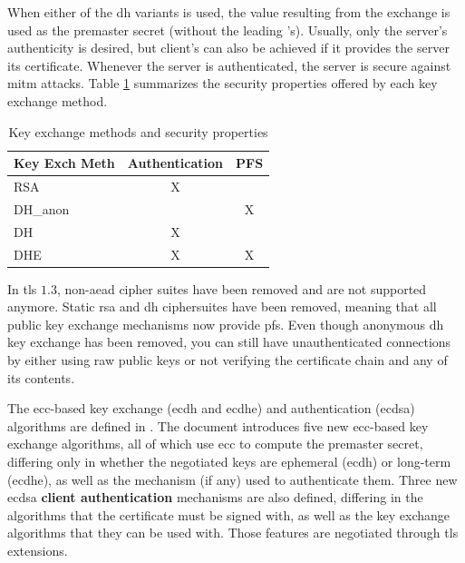 \documentclass{llncs}
\begin{document}
When either of the \gls{dh} variants is used, the value resulting from the exchange is used
as the premaster secret (without the leading 's). Usually, only the server's
authenticity is desired, but client's can also be achieved if it provides the
server its certificate. Whenever the server is authenticated, the server is secure
against \gls{mitm} attacks. Table \ref{kemsp} summarizes the security properties
offered by each key exchange method.

\begin{table}[]
\centering
\caption{Key exchange methods and security properties}
\label{kemsp}
\begin{tabular}{|l|c|l|}
\hline
\textbf{Key Exch Meth} & \multicolumn{1}{l|}{Authentication} & PFS                    \\ \hline
RSA                          & X                                   &                        \\ \hline
DH\_anon                     & \multicolumn{1}{l|}{}               & \multicolumn{1}{c|}{X} \\ \hline
DH                           & X                                   &                        \\ \hline
DHE                          & X                                   & \multicolumn{1}{c|}{X} \\ \hline
\end{tabular}
\end{table}

In \gls{tls} $1.3$, non-\gls{aead} cipher suites have been removed and are not supported anymore.
Static \gls{rsa} and \gls{dh} ciphersuites have been removed, meaning that all
public key exchange mechanisms now provide \gls{pfs}. Even though
anonymous \gls{dh} key exchange has been removed, you can still have
unauthenticated connections by either using raw public keys\cite{RFC7250} or not verifying the certificate chain and any of its contents.

The \gls{ecc}-based key exchange (\gls{ecdh} and \gls{ecdhe}) and authentication (\gls{ecdsa})
algorithms are defined in \cite{RFC4292}. The document introduces five new
\gls{ecc}-based key exchange algorithms, all of which use \gls{ecc} to compute
the premaster secret, differing only in whether the negotiated
keys are ephemeral (\gls{ecdh}) or long-term (\gls{ecdhe}), as well as the mechanism (if any) used to
authenticate them. Three new \gls{ecdsa} \textbf{client authentication} mechanisms are also defined,
differing in the algorithms that the certificate must be signed with, as well
as the key exchange algorithms that they can be used with.
Those features are negotiated through \gls{tls} extensions.
\end{document}
